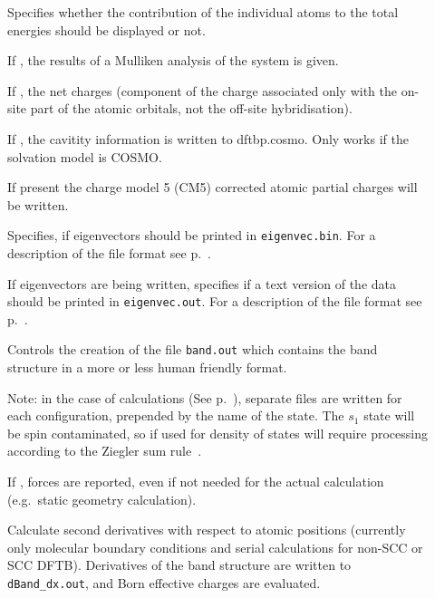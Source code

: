 \begin{description}

\item[] Specifies whether the contribution of the
  individual atoms to the total energies should be displayed or not.

\item[] If , the results of a Mulliken analysis of
  the system is given.

\item[] If , the net charges (component of the
  charge associated only with the on-site part of the atomic orbitals, not the
  off-site hybridisation).

\item[] If , the cavitity information is
  written to dftbp.cosmo. Only works if the solvation model is COSMO.

\item[] If present the charge model 5 (CM5)\cite{marenich2012} corrected
  atomic partial charges will be written.

\item[] Specifies, if eigenvectors should be printed in
  \verb|eigenvec.bin|. For a description of the file format see
  p.~.

\item[] If eigenvectors are being written, specifies if a
  text version of the data should be printed in \verb|eigenvec.out|. For a
  description of the file format see p.~.

\item[] Controls the creation of the file
  \verb|band.out| which contains the band structure in a more or less
  human friendly format.

  Note: in the case of  calculations (See
  p.~), separate files are written for each
  configuration, prepended by the name of the state. The $s_1$ state
  will be spin contaminated, so if used for density of states will
  require processing according to the Ziegler sum
  rule~\cite{baerends-TCA-43-261}.

\item[] If , forces are reported, even if not needed
  for the actual calculation (e.g.\ static geometry calculation).

\item[] Calculate second derivatives with respect
  to atomic positions (currently only molecular boundary conditions
  and serial calculations for non-SCC or SCC DFTB). Derivatives of the band
  structure are written to \verb|dBand_dx.out|, and Born effective
  charges are evaluated.

\end{description}

